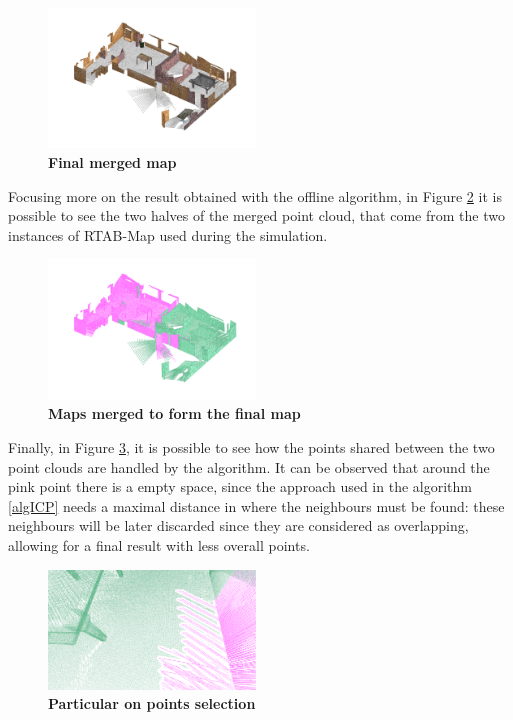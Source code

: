 \begin{figure}[H]
  \begin{center}
    \includegraphics[width=0.49\textwidth]{img/merged.png}
  \end{center}
  \caption[]{
    \textbf{Final merged map} 
  }
  \label{fig:merged}
\end{figure}

Focusing more on the result obtained with the offline algorithm, in Figure \ref{fig:split} it is possible to see the two halves of the merged point cloud, that come from the two instances of RTAB-Map used during the simulation. 

\begin{figure}[H]
  \begin{center}
    \includegraphics[width=0.49\textwidth]{img/split.png}
  \end{center}
  \caption[]{
    \textbf{Maps merged to form the final map} 
  }
  \label{fig:split}
\end{figure}

Finally, in Figure \ref{fig:example}, it is possible to see how the points shared between the two point clouds are handled by the algorithm. It can be observed that around the pink point there is a empty space, since the approach used in the algorithm \ref{algICP} needs a maximal distance in where the neighbours must be found: these neighbours will be later discarded since they are considered as overlapping, allowing for a final result with less overall points.

\begin{figure}[b]
  \begin{center}
    \includegraphics[width=0.49\textwidth]{img/example.png}
  \end{center}
  \caption[]{
    \textbf{Particular on points selection} 
  }
  \label{fig:example}
\end{figure}



